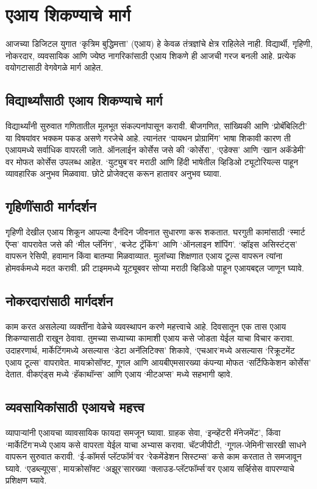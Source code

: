 \chapter{एआय शिकण्याचे मार्ग}

आजच्या डिजिटल युगात `कृत्रिम बुद्धिमत्ता' (एआय) हे केवळ तंत्रज्ञांचे क्षेत्र राहिलेले नाही. विद्यार्थी, गृहिणी, नोकरदार, व्यवसायिक आणि ज्येष्ठ नागरिकांसाठी एआय शिकणे ही आजची गरज बनली आहे. प्रत्येक वयोगटासाठी वेगवेगळे मार्ग आहेत.

\section*{विद्यार्थ्यांसाठी एआय शिकण्याचे मार्ग}

विद्यार्थ्यांनी सुरुवात गणितातील मूलभूत संकल्पनांपासून करावी. बीजगणित, सांख्यिकी आणि `प्रोबॅबिलिटी' या विषयांवर भक्कम पकड असणे गरजेचे आहे. त्यानंतर `पायथन प्रोग्रामिंग' भाषा शिकावी कारण ती एआयमध्ये सर्वाधिक वापरली जाते.  ऑनलाईन कोर्सेस जसे की `कोर्सेरा', `एडेक्स'  आणि `खान अकॅडेमी' वर मोफत कोर्सेस उपलब्ध आहेत. `युट्युब'वर मराठी आणि हिंदी भाषेतील व्हिडिओ ट्यूटोरियल्स पाहून व्यावहारिक अनुभव मिळवावा. छोटे प्रोजेक्ट्स करून हातावर अनुभव घ्यावा.

\section*{गृहिणींसाठी  मार्गदर्शन}
गृहिणी देखील एआय शिकून आपल्या दैनंदिन जीवनात सुधारणा करू शकतात. घरगुती कामांसाठी `स्मार्ट ऍप्स' वापरावेत जसे की `मील प्लॅनिंग', `बजेट ट्रॅकिंग' आणि `ऑनलाइन शॉपिंग'. `व्हॉइस असिस्टंट्स' वापरून रेसिपी, हवामान किंवा बातम्या मिळवाव्यात. मुलांच्या शिक्षणात एआय टूल्स वापरून त्यांना होमवर्कमध्ये मदत करावी. फ्री टाइममध्ये यूट्यूबवर सोप्या मराठी व्हिडिओ पाहून एआयबद्दल जाणून घ्यावे.

\section*{नोकरदारांसाठी मार्गदर्शन}
काम करत असलेल्या व्यक्तींना वेळेचे व्यवस्थापन करणे महत्त्वाचे आहे. दिवसातून एक तास एआय शिकण्यासाठी राखून ठेवावा. तुमच्या सध्याच्या कामाशी एआय कसे जोडता येईल याचा विचार करावा.
उदाहरणार्थ, मार्केटिंगमध्ये असल्यास `डेटा अनॅलिटिक्स' शिकावे, `एचआर'मध्ये असल्यास `रिक्रूटमेंट एआय टूल्स' वापरावेत. मायक्रोसॉफ्ट, गूगल आणि आयबीएमसारख्या कंपन्या मोफत `सर्टिफिकेशन कोर्सेस' देतात. वीकएंड्स मध्ये `हॅकाथॉन्स' आणि एआय `मीटअप्स' मध्ये सहभागी व्हावे.

\section*{व्यवसायिकांसाठी एआयचे महत्त्व}
व्यापार्‍यांनी एआयचा व्यावसायिक फायदा समजून घ्यावा. ग्राहक सेवा, `इन्व्हेंटरी मॅनेजमेंट', किंवा `मार्केटिंग'मध्ये एआय कसे वापरता येईल याचा अभ्यास करावा.  चॅटजीपीटी, `गूगल-जेमिनी'सारखी साधने वापरून सुरुवात करावी. `ई-कॉमर्स प्लॅटफॉर्म'वर `रेकमेंडेशन सिस्टम्स' कसे काम करतात ते समजावून घ्यावे. `एडब्ल्यूएस', मायक्रोसॉफ्ट `अझूर'सारख्या `क्लाउड-प्लॅटफॉर्म्स'वर एआय सर्व्हिसेस वापरण्याचे प्रशिक्षण घ्यावे.

